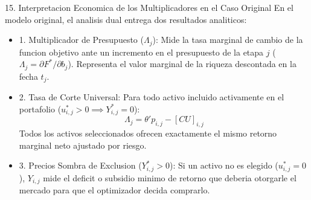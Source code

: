 \documentclass[aspectratio=169,10pt]{beamer}
\begin{document}
\begin{frame}{15. Interpretacion Economica de los Multiplicadores en el Caso Original}
  En el modelo original, el analisis dual entrega dos resultados analiticos:
  \vspace{0.3cm}
  \begin{itemize}
    \item 1. Multiplicador de Presupuesto ($\Lambda_j$):
    Mide la tasa marginal de cambio de la funcion objetivo ante un incremento en el presupuesto de la etapa $j$ ($\Lambda_j = \partial F^* / \partial b_j$). Representa el valor marginal de la riqueza descontada en la fecha $t_j$.
    \vspace{0.2cm}
    \item 2. Tasa de Corte Universal:
    Para todo activo incluido activamente en el portafolio ($u_{i,j}^* > 0 \implies Y_{i,j}^* = 0$):
    \begin{equation*}
      \Lambda_j = \theta' p_{i,j} - [C U]_{i,j}
    \end{equation*}
    Todos los activos seleccionados ofrecen exactamente el mismo retorno marginal neto ajustado por riesgo.
    \vspace{0.2cm}
    \item 3. Precios Sombra de Exclusion ($Y_{i,j}^* > 0$):
    Si un activo no es elegido ($u_{i,j}^* = 0$), $Y_{i,j}$ mide el deficit o subsidio minimo de retorno que deberia otorgarle el mercado para que el optimizador decida comprarlo.
  \end{itemize}
\end{frame}
\end{document}
